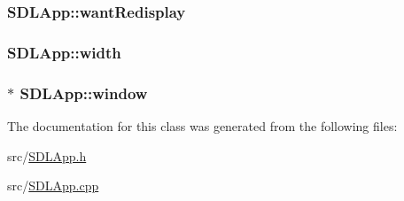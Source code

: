 \hypertarget{class_s_d_l_app_af08c1e44220e049fd418d83fcefcb65a}{
\subsubsection[{want\-Redisplay}]{ S\-D\-L\-App\-::want\-Redisplay}}\label{class_s_d_l_app_af08c1e44220e049fd418d83fcefcb65a}
\hypertarget{class_s_d_l_app_a7312e946df07c8cc67d60f3b526eb7e3}{
\subsubsection[{width}]{ S\-D\-L\-App\-::width}}\label{class_s_d_l_app_a7312e946df07c8cc67d60f3b526eb7e3}
\hypertarget{class_s_d_l_app_a3e580384a6e338d91c5f6b474324ac72}{
\subsubsection[{window}]{$\ast$ S\-D\-L\-App\-::window}}\label{class_s_d_l_app_a3e580384a6e338d91c5f6b474324ac72}


The documentation for this class was generated from the following files\-:\begin{DoxyCompactItemize}
\item 
src/\hyperlink{_s_d_l_app_8h}{S\-D\-L\-App.\-h}\item 
src/\hyperlink{_s_d_l_app_8cpp}{S\-D\-L\-App.\-cpp}\end{DoxyCompactItemize}
